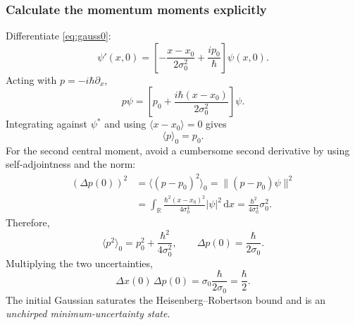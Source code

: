 \documentclass[11pt,a4paper]{article}
\newcommand{\dd}{\mathrm{d}}
\newcommand{\R}{\mathbb R}
\begin{document}
\subsubsection{Calculate the momentum moments explicitly}
Differentiate \eqref{eq:gauss0}:
\begin{equation}
\psi'(x,0)=\left[-\frac{x-x_0}{2\sigma_0^2}+\frac{ip_0}{\hbar}\right]\psi(x,0).
\end{equation}
Acting with $p=-i\hbar\partial_x$,
\begin{equation}\label{eq:p_on_gauss}
\boxed{p\psi=\left[p_0+\frac{i\hbar(x-x_0)}{2\sigma_0^2}\right]\psi}.
\end{equation}
Integrating against $\psi^*$ and using $\langle x-x_0\rangle=0$ gives
\begin{equation}\boxed{\langle p\rangle_0=p_0}.
\end{equation}
For the second central moment, avoid a cumbersome second derivative by using self-adjointness and the norm:
\begin{align}
(\Delta p(0))^2
&=\langle(p-p_0)^2\rangle_0
=\|(p-p_0)\psi\|^2\\
&=\int_{\R}\frac{\hbar^2(x-x_0)^2}{4\sigma_0^4}|\psi|^2\,\dd x
=\frac{\hbar^2}{4\sigma_0^4}\sigma_0^2.
\end{align}
Therefore,
\begin{equation}\label{eq:gaussunc0}
\boxed{\langle p^2\rangle_0=p_0^2+\frac{\hbar^2}{4\sigma_0^2}},\qquad
\boxed{\Delta p(0)=\frac{\hbar}{2\sigma_0}}.
\end{equation}
Multiplying the two uncertainties,
\begin{equation}\label{eq:initialUP}
\boxed{\Delta x(0)\,\Delta p(0)=\sigma_0\frac{\hbar}{2\sigma_0}=\frac\hbar2}.
\end{equation}
The initial Gaussian saturates the Heisenberg--Robertson bound and is an \emph{unchirped minimum-uncertainty state}.
\end{document}
